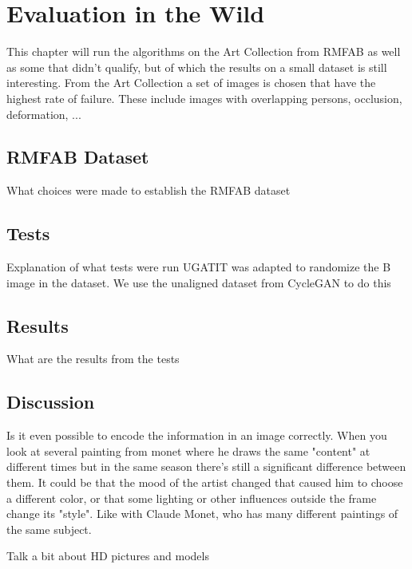 \chapter{Evaluation in the Wild}
This chapter will run the algorithms on the Art Collection from \gls{RMFAB}
as well as some that didn't qualify, but of which the results on a small dataset is still interesting.
From the Art Collection a set of images is chosen that have the highest rate of failure.
These include images with overlapping persons, occlusion, deformation, ...

\section{RMFAB Dataset}
What choices were made to establish the RMFAB dataset

\section{Tests}

Explanation of what tests were run
UGATIT was adapted to randomize the B image in the dataset.
We use the unaligned dataset from CycleGAN to do this

\section{Results}
What are the results from the tests

\section{Discussion}
Is it even possible to encode the information in an image correctly.
When you look at several painting from monet where he draws the same "content" at different times but in the same season there's still a significant difference between them.
It could be that the mood of the artist changed that caused him to choose a different color, or that some lighting or other influences outside the frame change its "style".
Like with Claude Monet, who has many different paintings of the same subject.

Talk a bit about HD pictures and models